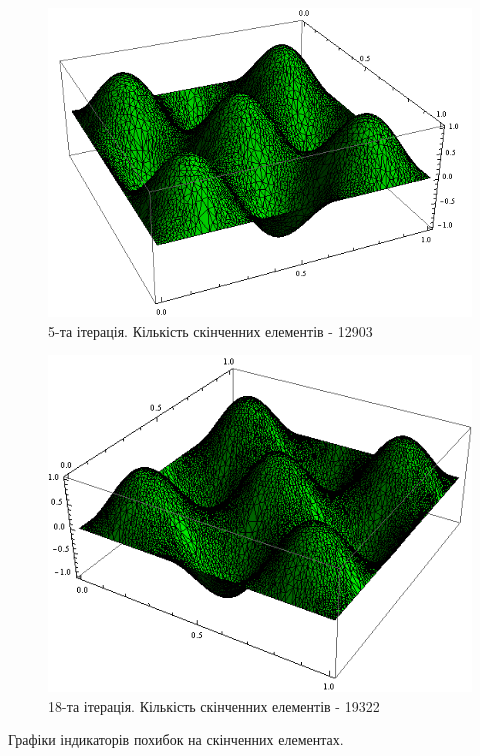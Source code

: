 \begin{figure}[H]
	\centering
    \includegraphics[scale=0.7]{problem1/MY/solutions/5}
    \caption{5-та ітерація. Кількість скінченних елементів - 12903}
    \label{fig:p1_solution5}
\end{figure}

\begin{figure}[H]
	\centering
    \includegraphics[scale=0.7]{problem1/MY/solutions/18}
    \caption{18-та ітерація. Кількість скінченних елементів - 19322}
    \label{fig:p1_solution18}
\end{figure}

Графіки індикаторів похибок на скінченних елементах.

